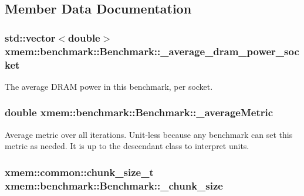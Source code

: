 \subsection{Member Data Documentation}
\hypertarget{classxmem_1_1benchmark_1_1_benchmark_a179b20d5ac798c140650aa82e3658273}{
\subsubsection[{\-\_\-average\-\_\-dram\-\_\-power\-\_\-socket}]{\setlength{\rightskip}{0pt plus 5cm}std\-::vector$<$double$>$ xmem\-::benchmark\-::\-Benchmark\-::\-\_\-average\-\_\-dram\-\_\-power\-\_\-socket\hspace{0.3cm}{\ttfamily [protected]}}}\label{classxmem_1_1benchmark_1_1_benchmark_a179b20d5ac798c140650aa82e3658273}
The average D\-R\-A\-M power in this benchmark, per socket. \hypertarget{classxmem_1_1benchmark_1_1_benchmark_a303386b7b243e39f2ca9a041ae819162}{
\subsubsection[{\-\_\-average\-Metric}]{\setlength{\rightskip}{0pt plus 5cm}double xmem\-::benchmark\-::\-Benchmark\-::\-\_\-average\-Metric\hspace{0.3cm}{\ttfamily [protected]}}}\label{classxmem_1_1benchmark_1_1_benchmark_a303386b7b243e39f2ca9a041ae819162}
Average metric over all iterations. Unit-\/less because any benchmark can set this metric as needed. It is up to the descendant class to interpret units. \hypertarget{classxmem_1_1benchmark_1_1_benchmark_ae01156a2db05a6e3f7928a7433688f56}{
\subsubsection[{\-\_\-chunk\-\_\-size}]{\setlength{\rightskip}{0pt plus 5cm}xmem\-::common\-::chunk\-\_\-size\-\_\-t xmem\-::benchmark\-::\-Benchmark\-::\-\_\-chunk\-\_\-size\hspace{0.3cm}{\ttfamily [protected]}}}\label{classxmem_1_1benchmark_1_1_benchmark_ae01156a2db05a6e3f7928a7433688f56}
